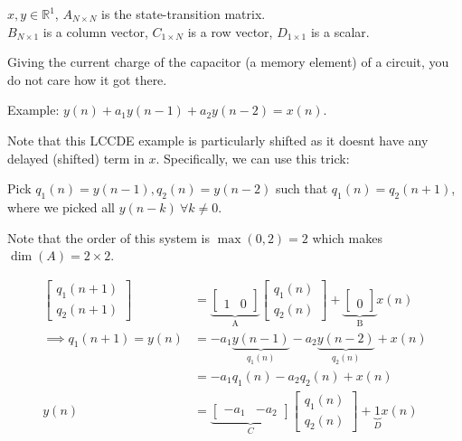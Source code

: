 $x, y\in\mathbb R^1$, $A_{N\times N}$ is the state-transition matrix.\\
$B_{N\times 1}$ is a column vector, $C_{1\times N}$ is a row vector, $D_{1\times1}$ is a scalar.

Giving the current charge of the capacitor (a memory element) of a circuit, you do not care how it got there.

Example: $y(n)+a_1 y(n-1) + a_2 y(n-2) = x(n)$.

Note that this LCCDE example is particularly shifted as it doesnt have any delayed (shifted) term in $x$. Specifically, we can use this trick:

Pick $q_1(n)=y(n-1), q_2(n)=y(n-2)$ such that $q_1(n)=q_2(n+1)$, \\
where we picked all $y(n-k)\ \forall k\ne0$.

Note that the order of this system is $\max(0, 2) = 2$ which makes $\dim(A) = 2\times 2$.

\begin{align*}
    \begin{bmatrix}
        q_1(n+1)
        \\
        q_2(n+1)
    \end{bmatrix}
    &=
    \underbrace{
    \begin{bmatrix}
         & 
        \\
        1 & 0 
    \end{bmatrix}
    }_\text{A}
    \begin{bmatrix}
        q_1(n)
        \\
        q_2(n)
    \end{bmatrix}
    +
    \underbrace{
    \begin{bmatrix}
        \ 
        \\
        0
    \end{bmatrix}
    }_\text{B}
    x(n)
    \\
    \implies
    q_1(n+1)
    = y(n)
    &= 
    -a_1\underbrace{y(n-1)}_{q_1(n)} -a_2\underbrace{y(n-2)}_{q_2(n)} + x(n)
    \\
    &= -a_1 q_1(n) -a_2 q_2(n) + x(n)
    \\
    y(n)
    &=
    \underbrace{
    \begin{bmatrix}
        -a_1 & -a_2
    \end{bmatrix}}
    _C
    \begin{bmatrix}
        q_1(n) 
        \\ 
        q_2(n)
    \end{bmatrix}
    + 
    \underbrace{1}_D x(n)
\end{align*}